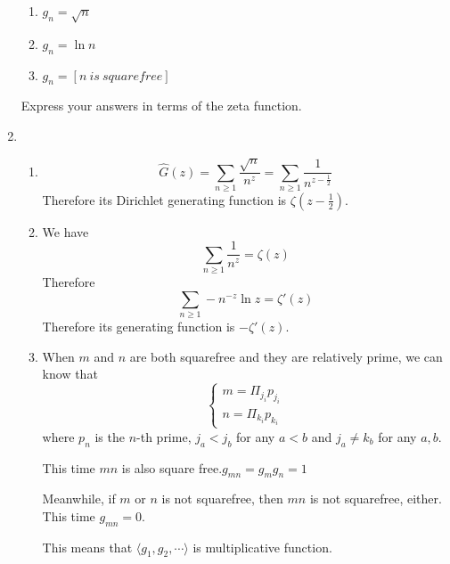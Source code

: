 \documentclass[12pt,a4paper]{article}
\makeatletter
\newtheorem*{solution}{Solution}
\theoremstyle{definition}
\renewenvironment{solution}[1][Solution] {\par\pushQED{\qed}\normalfont\topsep6\p@\@plus6\p@\relax\trivlist\item[\hskip\labelsep\bfseries#1\@addpunct{.}]\ignorespaces}{\popQED\endtrivlist\@endpefalse} \makeatother
\makeatother
\begin{document}
\begin{enumerate}
\begin{enumerate}
        	\item 
        	    $g_n=\sqrt{n}$
        	\item 
        	    $g_n=\ln n$
        	\item 
        	    $g_n=[n\ is\ squarefree]$
        \end{enumerate}
        Express your answers in terms of the zeta function.
        \begin{solution}
        	\begin{enumerate}
        		\item 
        		    \begin{equation*}
        		        \hat{G}(z)=\sum_{n\ge 1}\frac{\sqrt{n}}{n^z}=\sum_{n \ge 1}\frac{1}{n^{z-\frac{1}{2}}}
        		    \end{equation*}
        		    Therefore its Dirichlet generating function is $\zeta(z-\frac{1}{2})$.
        		\item 
        		    We have
        		    \begin{equation*}
        		        \sum_{n \ge 1}\frac{1}{n^z}=\zeta(z)
        		    \end{equation*}
        		    Therefore
        		    \begin{equation*}
        		        \sum_{n \ge 1}-n^{-z}\ln z=\zeta'(z)
        		    \end{equation*}
        		    Therefore its generating function is $-\zeta'(z)$.
        		\item 
        		    When $m$ and $n$ are both squarefree and they are relatively prime, we can know that
        		    \begin{equation*}
        		        \begin{cases}
        		            m=\Pi_{j_i} p_{j_i}\\
        		            n=\Pi_{k_i} p_{k_i}
        		        \end{cases}
        		    \end{equation*}
        		    where $p_n$ is the $n$-th prime, $j_a<j_b$ for any $a<b$ and $j_a \neq k_b$ for any $a,b$.
        		    
        		    This time $mn$ is also square free.$g_{mn}=g_mg_n=1$
        		    
        		    Meanwhile, if $m$ or $n$ is not squarefree, then $mn$ is not squarefree, either. This time $g_{mn}=0$.
        		    
        		    This means that $\langle g_1,g_2,\cdots \rangle$ is multiplicative function.
        		    

\end{enumerate}
\end{solution}
\end{enumerate}
\end{document}
